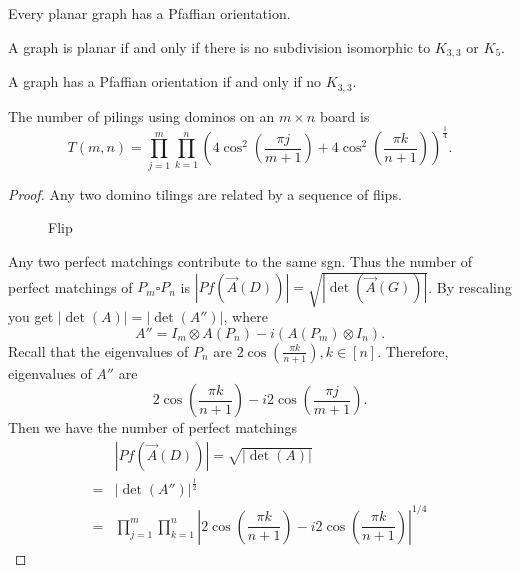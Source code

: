 \begin{theorem}
Every planar graph has a Pfaffian orientation.
\end{theorem}
\begin{theorem}
A graph is planar if and only if there is no subdivision isomorphic to $K_{3,3}$ or $K_5$.
\end{theorem}
\begin{theorem}
A graph has a Pfaffian orientation if and only if no $K_{3,3}$.
\end{theorem}
\begin{theorem}
The number of pilings using dominos on an $m\times n$ board is 
$$T(m,n)=\prod_{j=1}^{m}\prod_{k=1}^n(4\cos^2(\frac{\pi j}{m+1})+4\cos^2(\frac{\pi k}{n+1}))^{\frac{1}{4}}.$$
\end{theorem}
\begin{proof}
Any two domino tilings are related by a sequence of flips.
\begin{figure}[h!]
\centering
{}
\label{fig:domino_flip}
\caption{Flip}
\end{figure}
Any two perfect matchings contribute to the same sgn. Thus the number of perfect matchings of $P_m\square P_n$ is $|Pf(\vec{A}(D))|=\sqrt{|\det(\vec{A}(G))|}$. By rescaling you get $|\det(A)|=|\det(A'')|$, where 
$$A''=I_m\otimes A(P_n)-i(A(P_m)\otimes I_n).$$
Recall that the eigenvalues of $P_n$ are $2\cos(\frac{\pi k}{n+1}),k\in[n]$. Therefore, eigenvalues of $A''$ are 
$$2\cos(\frac{\pi k}{n+1})-i2\cos(\frac{\pi j}{m+1}).$$
Then we have the number of perfect matchings 
\begin{align*}
&|Pf(\vec{A}(D))|=\sqrt{|\det(A)|}\\
=&|\det(A'')|^{\frac{1}{2}}\\
=&\prod_{j=1}^{m}\prod_{k=1}^n |2\cos(\dfrac{\pi k}{n+1}) - i 2\cos(\dfrac{\pi k}{n+1})|^{1/4}
\end{align*}


\end{proof}

